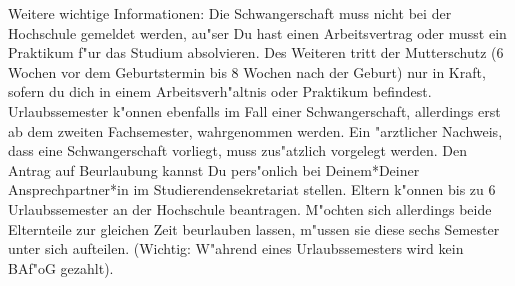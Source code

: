 \begin{artikel}{Weitere wichtige Informationen:}
Die Schwangerschaft muss nicht bei der Hochschule gemeldet werden, au"ser Du hast einen Arbeitsvertrag oder musst ein Praktikum f"ur das Studium absolvieren. Des Weiteren tritt der Mutterschutz (6 Wochen vor dem Geburtstermin bis 8 Wochen nach der Geburt) nur in Kraft, sofern du dich in einem Arbeitsverh"altnis oder Praktikum befindest.
Urlaubssemester k"onnen ebenfalls im Fall einer Schwangerschaft, allerdings erst ab dem zweiten Fachsemester, wahrgenommen werden. Ein "arztlicher Nachweis, dass eine Schwangerschaft vorliegt, muss zus"atzlich vorgelegt werden. Den Antrag auf Beurlaubung kannst Du pers"onlich bei Deinem*Deiner Ansprechpartner*in im Studierendensekretariat stellen. Eltern k"onnen bis zu 6 Urlaubssemester an der Hochschule beantragen. M"ochten sich allerdings beide Elternteile zur gleichen Zeit beurlauben lassen, m"ussen sie diese sechs Semester unter sich aufteilen. (Wichtig: W"ahrend eines Urlaubssemesters wird kein BAf"oG gezahlt).
\end{artikel}

